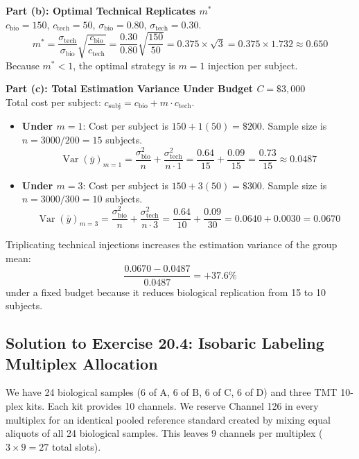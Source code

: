 \documentclass[11pt,twoside,openright]{book}
\begin{document}
\noindent
\textbf{Part (b): Optimal Technical Replicates $m^*$}\\
$c_{\text{bio}} = 150$, $c_{\text{tech}} = 50$, $\sigma_{\text{bio}} = 0.80$, $\sigma_{\text{tech}} = 0.30$.
\begin{equation}
m^* = \frac{\sigma_{\text{tech}}}{\sigma_{\text{bio}}} \sqrt{\frac{c_{\text{bio}}}{c_{\text{tech}}}} = \frac{0.30}{0.80} \sqrt{\frac{150}{50}} = 0.375 \times \sqrt{3} = 0.375 \times 1.732 \approx 0.650
\end{equation}
Because $m^* < 1$, the optimal strategy is $m = 1$ injection per subject.

\noindent
\textbf{Part (c): Total Estimation Variance Under Budget $C = \$3,000$}\\
Total cost per subject: $c_{\text{subj}} = c_{\text{bio}} + m \cdot c_{\text{tech}}$.
\begin{itemize}
    \item \textbf{Under $m = 1$}: Cost per subject is $150 + 1(50) = \$200$. Sample size is $n = 3000 / 200 = 15$ subjects.
    \begin{equation}
    \operatorname{Var}(\bar{y})_{m=1} = \frac{\sigma^2_{\text{bio}}}{n} + \frac{\sigma^2_{\text{tech}}}{n \cdot 1} = \frac{0.64}{15} + \frac{0.09}{15} = \frac{0.73}{15} \approx 0.0487
    \end{equation}
    \item \textbf{Under $m = 3$}: Cost per subject is $150 + 3(50) = \$300$. Sample size is $n = 3000 / 300 = 10$ subjects.
    \begin{equation}
    \operatorname{Var}(\bar{y})_{m=3} = \frac{\sigma^2_{\text{bio}}}{n} + \frac{\sigma^2_{\text{tech}}}{n \cdot 3} = \frac{0.64}{10} + \frac{0.09}{30} = 0.0640 + 0.0030 = 0.0670
    \end{equation}
\end{itemize}
Triplicating technical injections increases the estimation variance of the group mean:
\begin{equation}
\frac{0.0670 - 0.0487}{0.0487} = +37.6\%
\end{equation}
under a fixed budget because it reduces biological replication from 15 to 10 subjects.

\subsection{Solution to Exercise 20.4: Isobaric Labeling Multiplex Allocation}

We have 24 biological samples (6 of A, 6 of B, 6 of C, 6 of D) and three TMT 10-plex kits. Each kit provides 10 channels. We reserve Channel 126 in every multiplex for an identical pooled reference standard created by mixing equal aliquots of all 24 biological samples. This leaves 9 channels per multiplex ($3 \times 9 = 27$ total slots).
\end{document}

